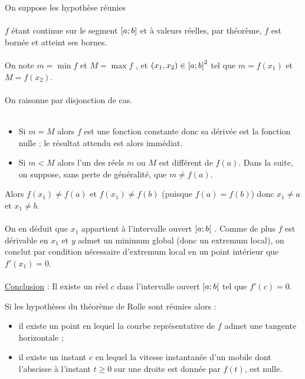 \begin{dem}
    On suppose les hypothèse réunies\\~\\
    \(f\) étant continue sur le segment \(\left[a;b\right]\) et à valeurs réelles, par théorème, \(f\) est bornée et atteint ses bornes.\\~\\
    On note \(m = \min f\) et \(M = \max f\) , et \((x_1, x_2) \in \left[a;b\right]^2\) tel que \(m = f (x_1)\) et \(M = f (x_2)\).\\~\\
    On raisonne par disjonction de cas.\\~\\
\begin{itemize}
    \item Si \(m = M\) alors \(f\) est une fonction constante donc sa dérivée est la fonction nulle ; le résultat attendu est alors immédiat.
    \item Si \(m < M\) alors l’un des réels \(m\) ou \(M\) est différent de \(f (a)\). Dans la suite, on suppose, sans perte de généralité, que \(m\neq f (a)\). 
\end{itemize}
    Alors \(f (x_1)\neq f (a)\) et \(f (x_1)\neq f (b)\) (puisque \(f (a) = f (b)\)) donc \(x_1\neq a\) et \(x_1\neq b\).\\~\\
    On en déduit que \(x_1\) appartient à l’intervalle ouvert \(\left]a;b\right[\) . Comme de plus \(f\) est dérivable en \(x_1\) et \(y\) admet un minimum global (donc un extremum local), on conclut par condition nécessaire d’extremum local en un point intérieur que \(f '(x_1) = 0\).\\~\\
    \underline{Conclusion} : Il existe un réel \(c\) dans l’intervalle ouvert \(\left]a;b\right[\) tel que \(f '(c) = 0\).
\end{dem}


\begin{defprop}    
    Si les hypothèses du théorème de Rolle sont réunies alors :
    \begin{itemize}
        \item il existe un point en lequel la courbe représentative de \(f\) admet une tangente horizontale ;
        \item il existe un instant \(c\) en lequel la vitesse instantanée d’un mobile dont l’abscisse à l’instant \(t \geq 0\) sur une droite est donnée par \(f (t)\), est nulle.
    \end{itemize}
\end{defprop}


